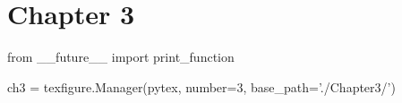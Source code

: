\chapter{Chapter 3}\label{ch:3}  %

\begin{pycode}[chapter3]
from __future__ import print_function

ch3 = texfigure.Manager(pytex, number=3, base_path='./Chapter3/')
\end{pycode}
